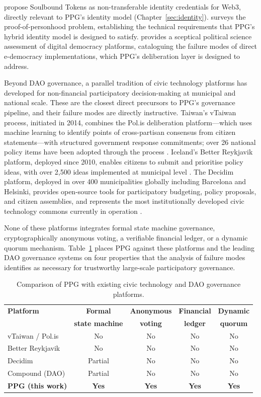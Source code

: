 \documentclass[12pt,a4paper,oneside]{report}
\begin{document}
\citet{buterin2022desoc} propose Soulbound Tokens as non-transferable identity credentials for Web3, directly relevant to PPG's identity model (Chapter~\ref{sec:identity}). \citet{ford2020identity} surveys the proof-of-personhood problem, establishing the technical requirements that PPG's hybrid identity model is designed to satisfy. \citet{mueller2019digital} provides a sceptical political science assessment of digital democracy platforms, cataloguing the failure modes of direct e-democracy implementations, which PPG's deliberation layer is designed to address.

Beyond DAO governance, a parallel tradition of civic technology platforms has developed for non-financial participatory decision-making at municipal and national scale. These are the closest direct precursors to PPG's governance pipeline, and their failure modes are directly instructive. Taiwan's vTaiwan process, initiated in 2014, combines the Pol.is deliberation platform---which uses machine learning to identify points of cross-partisan consensus from citizen statements---with structured government response commitments; over 26 national policy items have been adopted through the process \citep{tang2019digital}. Iceland's Better Reykjavik platform, deployed since 2010, enables citizens to submit and prioritise policy ideas, with over 2{,}500 ideas implemented at municipal level \citep{gilman2016better}. The Decidim platform, deployed in over 400 municipalities globally including Barcelona and Helsinki, provides open-source tools for participatory budgeting, policy proposals, and citizen assemblies, and represents the most institutionally developed civic technology commons currently in operation \citep{barandiaran2017decidim}.

None of these platforms integrates formal state machine governance, cryptographically anonymous voting, a verifiable financial ledger, or a dynamic quorum mechanism. Table~\ref{tab:civictech} places PPG against these platforms and the leading DAO governance systems on four properties that the analysis of failure modes identifies as necessary for trustworthy large-scale participatory governance.

\begin{table}[htbp]
\centering
\caption{Comparison of PPG with existing civic technology and DAO governance platforms.}
\label{tab:civictech}
\begin{tabular}{lcccc}
\toprule
\textbf{Platform} & \textbf{Formal} & \textbf{Anonymous} & \textbf{Financial} & \textbf{Dynamic} \\
& \textbf{state machine} & \textbf{voting} & \textbf{ledger} & \textbf{quorum} \\
\midrule
vTaiwan / Pol.is & No & No & No & No \\
Better Reykjavik & No & No & No & No \\
Decidim & Partial & No & No & No \\
Compound (DAO) & Partial & No & No & No \\
\textbf{PPG (this work)} & \textbf{Yes} & \textbf{Yes} & \textbf{Yes} & \textbf{Yes} \\
\bottomrule
\end{tabular}
\end{table}
\end{document}
